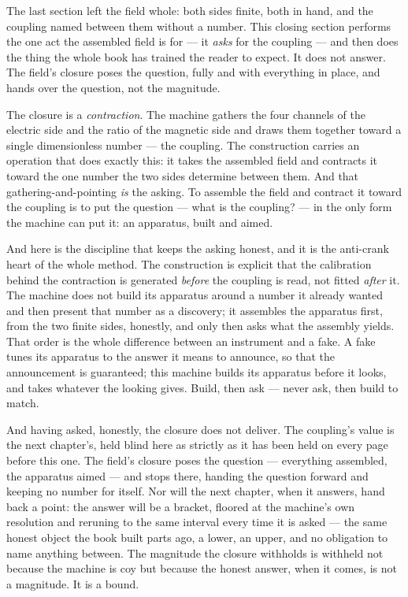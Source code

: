 The last section left the field whole: both sides finite, both in hand, and the coupling named between them without a
number. This closing section performs the one act the assembled field is for --- it \emph{asks} for the coupling ---
and then does the thing the whole book has trained the reader to expect. It does not answer. The field's closure poses
the question, fully and with everything in place, and hands over the question, not the magnitude.

The closure is a \emph{contraction}. The machine gathers the four channels of the electric side and the ratio of the
magnetic side and draws them together toward a single dimensionless number --- the coupling. The construction carries
an operation that does exactly this: it takes the assembled field and contracts it toward the one number the two sides
determine between them. And that gathering-and-pointing \emph{is} the asking. To assemble the field and contract it
toward the coupling is to put the question --- what is the coupling? --- in the only form the machine can put it: an
apparatus, built and aimed.

And here is the discipline that keeps the asking honest, and it is the anti-crank heart of the whole method. The
construction is explicit that the calibration behind the contraction is generated \emph{before} the coupling is read,
not fitted \emph{after} it. The machine does not build its apparatus around a number it already wanted and then present
that number as a discovery; it assembles the apparatus first, from the two finite sides, honestly, and only then asks
what the assembly yields. That order is the whole difference between an instrument and a fake. A fake tunes its
apparatus to the answer it means to announce, so that the announcement is guaranteed; this machine builds its apparatus
before it looks, and takes whatever the looking gives. Build, then ask --- never ask, then build to match.

And having asked, honestly, the closure does not deliver. The coupling's value is the next chapter's, held blind here
as strictly as it has been held on every page before this one. The field's closure poses the question --- everything
assembled, the apparatus aimed --- and stops there, handing the question forward and keeping no number for itself. Nor
will the next chapter, when it answers, hand back a point: the answer will be a bracket, floored at the machine's own
resolution and reruning to the same interval every time it is asked --- the same honest object the book built parts
ago, a lower, an upper, and no obligation to name anything between. The magnitude the closure withholds is withheld not
because the machine is coy but because the honest answer, when it comes, is not a magnitude. It is a bound.

